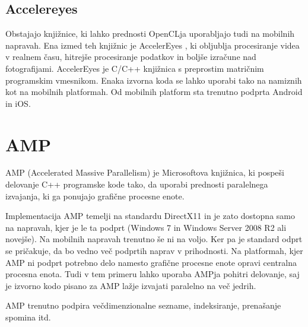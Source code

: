 \subsection{Accelereyes}

Obstajajo knjižnice, ki lahko prednosti OpenCLja uporabljajo tudi na mobilnih napravah. Ena izmed teh knjižnic je AccelerEyes \cite{accelereyes}, ki obljublja procesiranje videa v realnem času, hitrejše procesiranje podatkov in boljše izračune nad fotografijami. AccelerEyes je C/C++ knjižnica s preprostim matričnim programskim vmesnikom. Enaka izvorna koda se lahko uporabi tako na namiznih kot na mobilnih platformah. Od mobilnih platform sta trenutno podprta Android in iOS.

\section{AMP}

AMP (Accelerated Massive Parallelism) je Microsoftova knjižnica, ki pospeši delovanje C++ programske kode tako, da uporabi prednosti paralelnega izvajanja, ki ga ponujajo grafične procesne enote. 

Implementacija AMP temelji na standardu DirectX11 in je zato dostopna samo na napravah, kjer je le ta podprt (Windows 7 in Windows Server 2008 R2 ali novejše). Na mobilnih napravah trenutno še ni na voljo. Ker pa je standard odprt se pričakuje, da bo vedno več podprtih naprav v prihodnosti. Na platformah, kjer AMP ni podprt potrebno delo namesto grafične procesne enote opravi centralna procesna enota. Tudi v tem primeru lahko uporaba AMPja pohitri delovanje, saj je izvorno kodo pisano za AMP lažje izvajati paralelno na več jedrih.

AMP trenutno podpira večdimenzionalne sezname, indeksiranje, prenašanje spomina itd.




